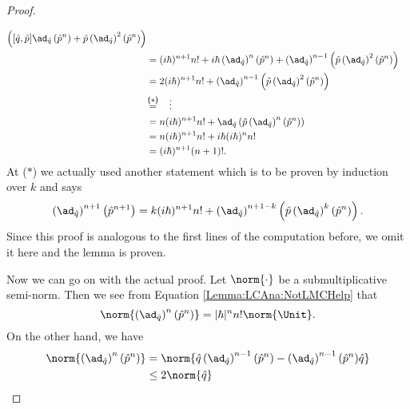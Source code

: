 \begin{proof}
\begin{subproof}
\begin{align*}
			\left(
				[\hat{q}, \hat{p}]
				\ad_{\hat{q}} \left( \hat{p}^n \right)
				+
				\hat{p}
				\left( \ad_{\hat{q}} \right)^2
				\left( \hat{p}^n \right)
			\right)
			\\
			& =
			(i \hbar)^{n + 1} n!
			+
			i \hbar
			\left( \ad_{\hat{q}} \right)^{n}
			\left( \hat{p}^n \right)
			+
			\left( \ad_{\hat{q}} \right)^{n-1}
			\left(
				\hat{p}
				\left( \ad_{\hat{q}} \right)^2
				\left( \hat{p}^n \right)
			\right)
			\\
			& =
			2 (i \hbar)^{n+1} n!
			+
			\left( \ad_{\hat{q}} \right)^{n-1}
			\left(
				\hat{p}
				\left( \ad_{\hat{q}} \right)^2
				\left( \hat{p}^n \right)
			\right)
			\\
			& \ot{($*$)}{=} 
			\quad \vdots
			\\
			& =
			n (i \hbar)^{n+1} n!
			+
			\ad_{\hat{q}}
			\left(
				\hat{p}
				\left( \ad_{\hat{q}} \right)^n
				\left( \hat{p}^n \right)
			\right)
			\\
			& =
			n (i \hbar)^{n+1} n!
			+
			i \hbar (i \hbar)^n n!
			\\
			& =
			(i \hbar)^{n + 1} (n + 1)!.
		\end{align*}
		At ($*$) we actually used another statement which is to be 
		proven by induction over $k$ and says
		\begin{equation*}
			\left( \ad_{\hat{q}} \right)^{n + 1}
			\left( \hat{p}^{n + 1} \right)
			=
			k (i \hbar)^{n + 1} n!
			+
			\left( \ad_{\hat{q}} \right)^{n + 1 - k}
			\left(
				\hat{p}
				\left( \ad_{\hat{q}} \right)^k
				\left( \hat{p}^n \right)
			\right).
		\end{equation*}
		Since this proof is analogous to the first lines of the 
		computation before, we omit it here and the lemma is proven.
	\end{subproof}	
	Now we can go on with the actual proof. Let $\norm{\cdot}$ be a 
	submultiplicative semi-norm. Then we see from Equation 
	\eqref{Lemma:LCAna:NotLMCHelp} that
	\begin{equation*}
		\norm{
			\left( \ad_{\hat{q}} \right)^n
			(\hat{p}^n)
		}
		=
		|\hbar|^n n! \norm{ \Unit }.
	\end{equation*}
	On the other hand, we have
	\begin{align*}
		\norm{
			\left( \ad_{\hat{q}} \right)^n
			(\hat{p}^n)
		}
		& =
		\norm{
			\hat{q}
			\left( \ad_{\hat{q}} \right)^{n-1}
			(\hat{p}^n)
			-
			\left( \ad_{\hat{q}} \right)^{n-1}
			(\hat{p}^n)
			\hat{q}
		}
		\\
		& \leq
		2 \norm{\hat{q}}

\end{align*}
\end{proof}
